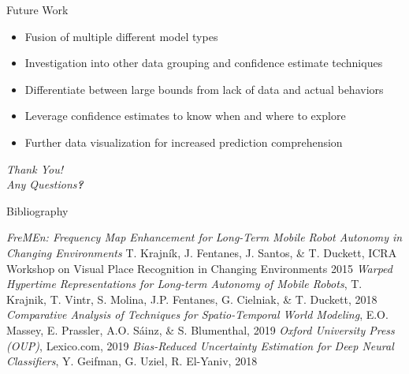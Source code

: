 \documentclass{beamer}
\begin{document}
\begin{frame}[t]{Future Work}

  \begin{itemize}
    \setlength\itemsep{1em}
      \item Fusion of multiple different model types
      \item Investigation into other data grouping and confidence estimate techniques
      \item Differentiate between large bounds from lack of data and actual behaviors
      \item Leverage confidence estimates to know when and where to explore
      \item Further data visualization for increased prediction comprehension

  \end{itemize}

\end{frame}


\begin{frame}

  \centering \huge
  \emph{Thank You!} \\
  \vspace*{1cm}
  \large
  \emph{Any Questions\textbf{?}}

\end{frame}

\begin{frame}[allowframebreaks]{Bibliography}
  \begin{thebibliography}{9}
        \emph{FreMEn: Frequency Map Enhancement for Long-Term Mobile Robot Autonomy in Changing Environments}
        T. Krajník, J. Fentanes, J. Santos, \& T. Duckett,
        ICRA Workshop on Visual Place Recognition in Changing Environments
        2015
        \emph{Warped Hypertime Representations for Long-term Autonomy of Mobile Robots},
        T. Krajnik, T. Vintr, S. Molina, J.P. Fentanes, G. Cielniak, \& T. Duckett,
        2018
        \emph{Comparative Analysis of Techniques for Spatio-Temporal World Modeling},
        E.O. Massey, E. Prassler, A.O. S{\'{a}}inz, \& S. Blumenthal,
        2019
        \emph{Oxford University Press (OUP)},
        Lexico.com,
        2019
        \emph{Bias-Reduced Uncertainty Estimation for Deep Neural Classifiers},
        Y. Geifman, G. Uziel, R. El-Yaniv,
        2018

  \end{thebibliography}
\end{frame}
\end{document}

